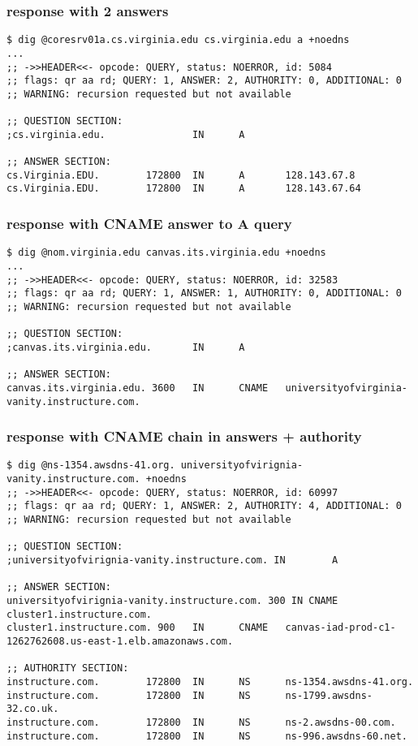 \begin{FragileFrame}
\frametitle{response with 2 answers}
\begin{Verbatim}[fontsize=\fontsize{10}{11}]
$ dig @coresrv01a.cs.virginia.edu cs.virginia.edu a +noedns
...
;; ->>HEADER<<- opcode: QUERY, status: NOERROR, id: 5084
;; flags: qr aa rd; QUERY: 1, ANSWER: 2, AUTHORITY: 0, ADDITIONAL: 0
;; WARNING: recursion requested but not available

;; QUESTION SECTION:
;cs.virginia.edu.               IN      A

;; ANSWER SECTION:
cs.Virginia.EDU.        172800  IN      A       128.143.67.8
cs.Virginia.EDU.        172800  IN      A       128.143.67.64
\end{Verbatim}
\end{FragileFrame}

\begin{FragileFrame}
\frametitle{response with CNAME answer to A query}
\begin{Verbatim}[fontsize=\fontsize{10}{11}]
$ dig @nom.virginia.edu canvas.its.virginia.edu +noedns
...
;; ->>HEADER<<- opcode: QUERY, status: NOERROR, id: 32583
;; flags: qr aa rd; QUERY: 1, ANSWER: 1, AUTHORITY: 0, ADDITIONAL: 0
;; WARNING: recursion requested but not available

;; QUESTION SECTION:
;canvas.its.virginia.edu.       IN      A

;; ANSWER SECTION:
canvas.its.virginia.edu. 3600   IN      CNAME   universityofvirginia-vanity.instructure.com.
\end{Verbatim}
\end{FragileFrame}

\begin{FragileFrame}
\frametitle{response  with CNAME chain in answers + authority}
\begin{Verbatim}[fontsize=\fontsize{10}{11}]
$ dig @ns-1354.awsdns-41.org. universityofvirignia-vanity.instructure.com. +noedns
;; ->>HEADER<<- opcode: QUERY, status: NOERROR, id: 60997
;; flags: qr aa rd; QUERY: 1, ANSWER: 2, AUTHORITY: 4, ADDITIONAL: 0
;; WARNING: recursion requested but not available

;; QUESTION SECTION:
;universityofvirignia-vanity.instructure.com. IN        A

;; ANSWER SECTION:
universityofvirignia-vanity.instructure.com. 300 IN CNAME cluster1.instructure.com.
cluster1.instructure.com. 900   IN      CNAME   canvas-iad-prod-c1-1262762608.us-east-1.elb.amazonaws.com.

;; AUTHORITY SECTION:
instructure.com.        172800  IN      NS      ns-1354.awsdns-41.org.
instructure.com.        172800  IN      NS      ns-1799.awsdns-32.co.uk.
instructure.com.        172800  IN      NS      ns-2.awsdns-00.com.
instructure.com.        172800  IN      NS      ns-996.awsdns-60.net.
\end{Verbatim}
\end{FragileFrame}

